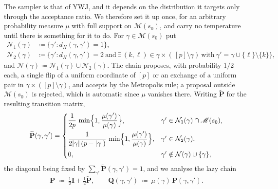 \documentclass[aos]{imsart}
\DeclarePairedDelimiter{\abs}{\lvert}{\rvert}
\theoremstyle{plain}
\theoremstyle{definition}
\begin{document}
    The sampler is that of YWJ, and it depends on the distribution it
    targets only through the acceptance ratio. We therefore set it up once,
    for an arbitrary probability measure $\mu$ with full support on
    $\mathscr{M}(s_0)$, and carry no temperature until there is something
    for it to do. For $\gamma\in\mathscr{M}(s_0)$ put
    \begin{equation}
        \label{eq:neigh}
        \begin{aligned}
            \mathcal{N}_1(\gamma)&\coloneq\bigl\{\gamma':
            d_H(\gamma,\gamma')=1\bigr\},\\
            \mathcal{N}_2(\gamma)&\coloneq\bigl\{\gamma':
            d_H(\gamma,\gamma')=2\ \text{and}\ \exists\,
            (k,\ell)\in\gamma\times(\,[p]\setminus\gamma)\ \text{with}\
            \gamma'=\gamma\cup\{\ell\}\setminus\{k\}\bigr\},
        \end{aligned}
    \end{equation}
    and $\mathcal{N}(\gamma)\coloneq\mathcal{N}_1(\gamma)\cup
    \mathcal{N}_2(\gamma)$. The chain proposes, with probability $1/2$ each, a
    single flip of a uniform coordinate of $[p]$ or an exchange of a uniform
    pair in $\gamma\times([p]\setminus\gamma)$, and accepts by the
    Metropolis rule; a proposal outside $\mathscr{M}(s_0)$ is rejected, which
    is automatic since $\mu$ vanishes there. Writing
    $\widetilde{\mathbf{P}}$ for the resulting transition matrix,
    \begin{equation}
        \label{eq:MH}
        \widetilde{\mathbf{P}}(\gamma,\gamma')=
        \begin{cases}
            \dfrac{1}{2p}\,
            \min\Bigl\{1,\dfrac{\mu(\gamma')}{\mu(\gamma)}\Bigr\},
            & \gamma'\in\mathcal{N}_1(\gamma)\cap\mathscr{M}(s_0),\\[3mm]
            \dfrac{1}{2\abs{\gamma}\,(p-\abs{\gamma})}\,
            \min\Bigl\{1,\dfrac{\mu(\gamma')}{\mu(\gamma)}\Bigr\},
            & \gamma'\in\mathcal{N}_2(\gamma),\\[3mm]
            0, & \gamma'\notin\mathcal{N}(\gamma)\cup\{\gamma\},
        \end{cases}
    \end{equation}
    the diagonal being fixed by $\sum_{\gamma'}\widetilde{\mathbf{P}}
    (\gamma,\gamma')=1$, and we analyse the lazy chain
    \begin{equation}
        \label{eq:lazy}
        \mathbf{P}\ \coloneq\ \tfrac12\mathbf{I}
        +\tfrac12\widetilde{\mathbf{P}},
        \qquad
        \mathbf{Q}(\gamma,\gamma')\ \coloneq\
        \mu(\gamma)\,\mathbf{P}(\gamma,\gamma') .
    \end{equation}
\end{document}
